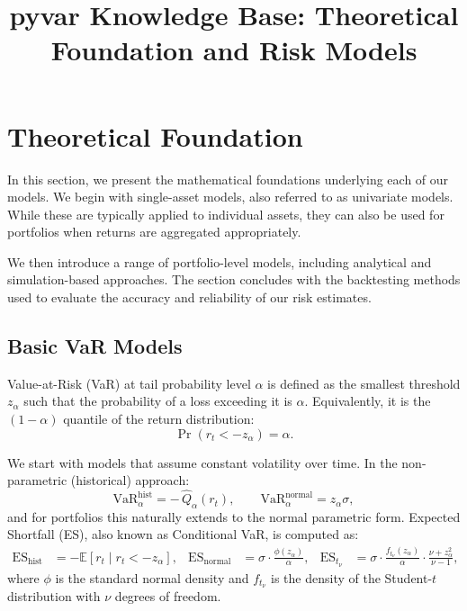\documentclass[12pt]{article}
\title{\textbf{pyvar Knowledge Base: Theoretical Foundation and Risk Models}}
\author{}
\date{}
\begin{document}
\maketitle
\tableofcontents
\newpage

\section{Theoretical Foundation}

In this section, we present the mathematical foundations underlying each of our models. We begin with single-asset models, also referred to as univariate models. While these are typically applied to individual assets, they can also be used for portfolios when returns are aggregated appropriately.

We then introduce a range of portfolio-level models, including analytical and simulation-based approaches. The section concludes with the backtesting methods used to evaluate the accuracy and reliability of our risk estimates.


\subsection{Basic VaR Models}

Value-at-Risk (VaR) at tail probability level $\alpha$ is defined as the smallest threshold $z_{\alpha}$ such that the probability of a loss exceeding it is $\alpha$. Equivalently, it is the $(1 - \alpha)$ quantile of the return distribution:
\[
\Pr\left(r_t < -z_{\alpha}\right) = \alpha.
\]

We start with models that assume constant volatility over time. In the non-parametric (historical) approach:
\[
\mathrm{VaR}_{\alpha}^{\mathrm{hist}} = -\,\widehat{Q}_{\alpha}(r_t), \qquad
\mathrm{VaR}_{\alpha}^{\mathrm{normal}} = z_{\alpha} \sigma,
\]
and for portfolios this naturally extends to the normal parametric form. Expected Shortfall (ES), also known as Conditional VaR, is computed as:
\[
\begin{aligned}
\mathrm{ES}_{\mathrm{hist}} &= -\mathbb{E}\left[r_t \mid r_t < -z_{\alpha}\right], &
\mathrm{ES}_{\mathrm{normal}} &= \sigma \cdot \frac{\phi(z_{\alpha})}{\alpha}, &
\mathrm{ES}_{t_\nu} &= \sigma \cdot \frac{f_{t_\nu}(z_{\alpha})}{\alpha} \cdot \frac{\nu + z_{\alpha}^2}{\nu - 1},
\end{aligned}
\]
where $\phi$ is the standard normal density and $f_{t_\nu}$ is the density of the Student-$t$ distribution with $\nu$ degrees of freedom.
\end{document}
